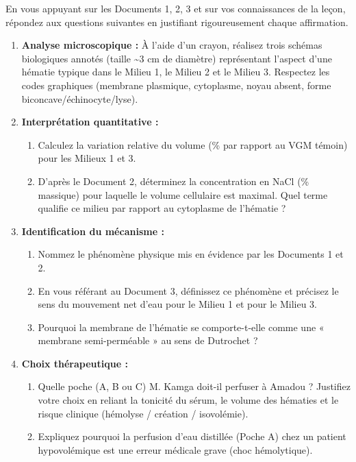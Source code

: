 \documentclass[11pt]{article}
\newcounter{popsec}
\newcounter{popsub}
\newcommand{\courssub}[1]{%
  \stepcounter{popsub}%
  \par\vspace{9pt}\noindent{\popxbold\fontsize{11.5}{13}\selectfont\color{popink}{\color{poporange}\thepopsec.\thepopsub}\hspace{6pt}#1}\par\nopagebreak\vspace{4pt}
}
\begin{document}
\courssub{Consignes}
En vous appuyant sur les Documents 1, 2, 3 et sur vos connaissances de la leçon, répondez aux questions suivantes en justifiant rigoureusement chaque affirmation.

\begin{enumerate}
    \item \textbf{Analyse microscopique :} À l'aide d'un crayon, réalisez trois schémas biologiques annotés (taille \textasciitilde 3 cm de diamètre) représentant l'aspect d'une hématie typique dans le Milieu 1, le Milieu 2 et le Milieu 3. Respectez les codes graphiques (membrane plasmique, cytoplasme, noyau absent, forme biconcave/échinocyte/lyse).
    \item \textbf{Interprétation quantitative :} 
    \begin{enumerate}
        \item Calculez la variation relative du volume (\% par rapport au VGM témoin) pour les Milieux 1 et 3.
        \item D'après le Document 2, déterminez la concentration en NaCl (\% massique) pour laquelle le volume cellulaire est maximal. Quel terme qualifie ce milieu par rapport au cytoplasme de l'hématie ?
    \end{enumerate}
    \item \textbf{Identification du mécanisme :} 
    \begin{enumerate}
        \item Nommez le phénomène physique mis en évidence par les Documents 1 et 2.
        \item En vous référant au Document 3, définissez ce phénomène et précisez le sens du mouvement net d'eau pour le Milieu 1 et pour le Milieu 3.
        \item Pourquoi la membrane de l'hématie se comporte-t-elle comme une « membrane semi-perméable » au sens de Dutrochet ?
    \end{enumerate}
    \item \textbf{Choix thérapeutique :} 
    \begin{enumerate}
        \item Quelle poche (A, B ou C) M. Kamga doit-il perfuser à Amadou ? Justifiez votre choix en reliant la tonicité du sérum, le volume des hématies et le risque clinique (hémolyse / création / isovolémie).
        \item Expliquez pourquoi la perfusion d'eau distillée (Poche A) chez un patient hypovolémique est une erreur médicale grave (choc hémolytique).
    \end{enumerate}

\end{enumerate}
\end{document}
